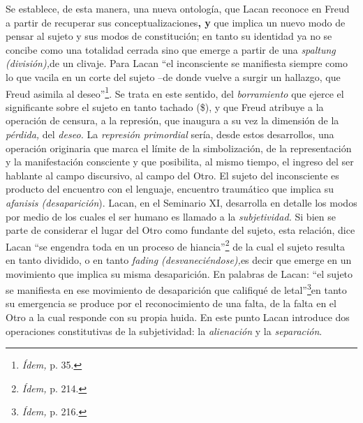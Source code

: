 Se establece, de esta manera, una nueva ontología, que Lacan reconoce en Freud a partir de recuperar sus conceptualizaciones\textbf{, y} que implica un nuevo modo de pensar al sujeto y sus modos de constitución; en tanto su identidad ya no se concibe como una totalidad cerrada sino que emerge a partir de una \emph{spaltung (división),}de un clivaje. Para Lacan \enquote{el inconsciente se manifiesta siempre como lo que vacila en un corte del sujeto --de donde vuelve a surgir un hallazgo, que Freud asimila al deseo}\footnote{\emph{Ídem,} p. 35.}. Se trata en este sentido, del \emph{borramiento} que ejerce el significante sobre el sujeto en tanto tachado (\$), y que Freud atribuye a la operación de censura, a la represión, que inaugura a su vez la dimensión de la \emph{pérdida,} del \emph{deseo.} La \emph{represión primordial} sería, desde estos desarrollos, una operación originaria que marca el límite de la simbolización, de la representación y la manifestación consciente y que posibilita, al mismo tiempo, el ingreso del ser hablante al campo discursivo, al campo del Otro. El sujeto del inconsciente es producto del encuentro con el lenguaje, encuentro traumático que implica su \emph{afanisis (desaparición}). Lacan, en el Seminario XI, desarrolla en detalle los modos por medio de los cuales el ser humano es llamado a la \emph{subjetividad.} Si bien se parte de considerar el lugar del Otro como fundante del sujeto, esta relación, dice Lacan \enquote{se engendra toda en un proceso de hiancia}\footnote{\emph{Ídem,} p. 214.} de la cual el sujeto resulta en tanto dividido, o en tanto \emph{fading (desvaneciéndose),}es decir que emerge en un movimiento que implica su misma desaparición. En palabras de Lacan: \enquote{el sujeto se manifiesta en ese movimiento de desaparición que califiqué de letal}\footnote{\emph{Ídem,} p. 216.}en tanto su emergencia se produce por el reconocimiento de una falta, de la falta en el Otro a la cual responde con su propia huida. En este punto Lacan introduce dos operaciones constitutivas de la subjetividad: la \emph{alienación} y la \emph{separación}.

